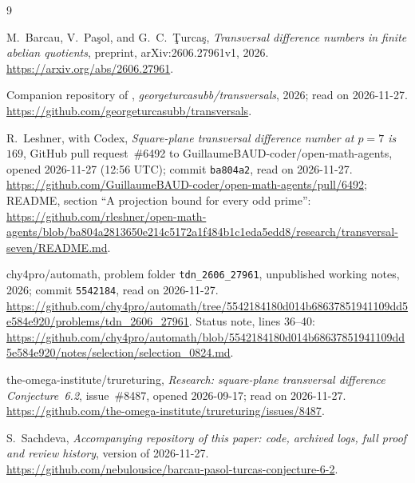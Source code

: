 \documentclass[11pt]{amsart}
\theoremstyle{definition}\newtheorem{definition}[theorem]{Definition}
\theoremstyle{remark}\newtheorem{remark}[theorem]{Remark}
\begin{document}
\begin{thebibliography}{9}\raggedright

M.~Barcau, V.~Pa\c{s}ol, and G.~C.~\c{T}urca\c{s}, \emph{Transversal difference numbers in finite abelian quotients}, preprint, arXiv:2606.27961v1, 2026.
\url{https://arxiv.org/abs/2606.27961}.

Companion repository of \cite{BPT}, \emph{georgeturcasubb/transversals}, 2026; read on 2026-11-27.
\url{https://github.com/georgeturcasubb/transversals}.

R.~Leshner, with Codex, \emph{Square-plane transversal difference number at \(p=7\) is \(169\)}, GitHub pull request~\#6492 to GuillaumeBAUD-coder/open-math-agents, opened 2026-11-27 (12:56 UTC); commit \texttt{ba804a2}, read on 2026-11-27.
\url{https://github.com/GuillaumeBAUD-coder/open-math-agents/pull/6492};
README, section ``A projection bound for every odd prime'':
\url{https://github.com/rleshner/open-math-agents/blob/ba804a2813650e214c5172a1f484b1c1eda5edd8/research/transversal-seven/README.md}.

chy4pro/automath, problem folder \texttt{tdn\_2606\_27961}, unpublished working notes, 2026; commit \texttt{5542184}, read on 2026-11-27.
\url{https://github.com/chy4pro/automath/tree/5542184180d014b68637851941109dd5e584e920/problems/tdn_2606_27961}.
Status note, lines 36--40:
\url{https://github.com/chy4pro/automath/blob/5542184180d014b68637851941109dd5e584e920/notes/selection/selection_0824.md}.

the-omega-institute/trureturing, \emph{Research: square-plane transversal difference Conjecture~6.2}, issue~\#8487, opened 2026-09-17; read on 2026-11-27.
\url{https://github.com/the-omega-institute/trureturing/issues/8487}.

S.~Sachdeva, \emph{Accompanying repository of this paper: code, archived logs, full proof and review history}, version of 2026-11-27.
\url{https://github.com/nebulousice/barcau-pasol-turcas-conjecture-6-2}.

\end{thebibliography}
\end{document}
